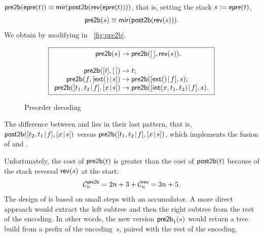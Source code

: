 \(\textsf{pre2b}(\textsf{epre}(t)) \equiv
\textsf{mir}(\textsf{post2b}(\textsf{rev}(\textsf{epre}(t))))\), that is, setting
the stack \(s := \textsf{epre}(t)\),
\begin{equation*}
\textsf{pre2b}(s) \equiv \textsf{mir}(\textsf{post2b}(\textsf{rev}(s))).
\end{equation*}
We obtain  by modifying
 in \fig~\vref{fig:pre2b}.
\begin{figure}
\begin{equation*}
\boxed{
\begin{array}{r@{\;}c@{\;}l}
\fun{pre2b}(s) & \rightarrow & \fun{pre2b}(\el,\fun{rev}(s)).\\
\\
\fun{pre2b}([t],\el) & \rightarrow & t;\\
\fun{pre2b}(f,\cons{\fun{ext}()}{s}) & \rightarrow & \fun{pre2b}(\cons{\fun{ext}()}{f},s);\\
\fun{pre2b}(\cons{t_1,t_2}{f},\cons{x}{s}) & \rightarrow &
\fun{pre2b}(\cons{\fun{int}(x,t_1,t_2)}{f},s).
\end{array}}
\end{equation*}
\caption{Preorder decoding}
\label{fig:pre2b}
\end{figure}
The difference between  and
 lies in their last
pattern, that is, \(\textsf{post2b}([{t_2,t_1}\!\mid\!{f}],[{x}\!\mid\!{s}])\)
versus \(\textsf{pre2b}([{t_1,t_2}\!\mid\!{f}],[{x}\!\mid\!{s}])\), which
implements the fusion of  and
.

Unfortunately, the cost of \(\textsf{pre2b}(t)\)
 is greater than the cost of
\(\textsf{post2b}(t)\) because of the stack reversal \(\textsf{rev}(s)\) at
the start:
\begin{equation*}
  \C{\fun{pre2b}}{n} = 2n + 3 + \C{\fun{rev}}{n} = 3n + 5.
  \index{pre2b@$\C{\fun{pre2b}}{n}$}\index{rev@$\C{\fun{rev}}{n}$}
\end{equation*}
The design of  is based on
small steps with an accumulator. A more direct approach would extract
the left subtree and then the right subtree from the rest of the
encoding. In other words, the new version
\(\textsf{pre2b}_1(s)\) would return a
tree build from a prefix of the encoding~\(s\), paired with the rest
of the encoding.

